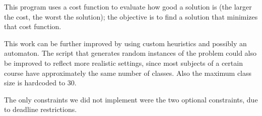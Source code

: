 \documentclass[runningheads]{llncs}
\begin{document}
This program uses a cost function to evaluate how good a solution is (the larger the cost, the worst the solution); the objective is to find a solution that minimizes that cost function.

This work can be further improved by using custom heuristics and possibly an automaton.
The script that generates random instances of the problem could also be improved to reflect more realistic settings, since most subjects of a certain course have approximately the same number of classes.
Also the maximum class size is hardcoded to 30.

The only constraints we did not implement were the two optional constraints, due to deadline restrictions.

%
%



\end{document}
